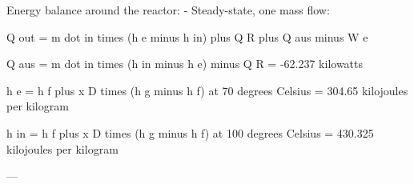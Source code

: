 Energy balance around the reactor:  
- Steady-state, one mass flow:  

Q out = m dot in times (h e minus h in) plus Q R plus Q aus minus W e  

Q aus = m dot in times (h in minus h e) minus Q R  
= -62.237 kilowatts  

h e = h f plus x D times (h g minus h f) at 70 degrees Celsius  
= 304.65 kilojoules per kilogram  

h in = h f plus x D times (h g minus h f) at 100 degrees Celsius  
= 430.325 kilojoules per kilogram  

---